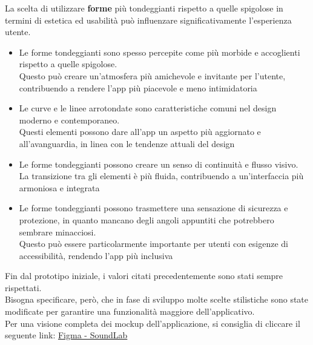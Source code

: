 \documentclass{article}
\begin{document}
		La scelta di utilizzare \textbf{forme} più tondeggianti rispetto a quelle spigolose in termini di estetica ed usabilità può influenzare significativamente l'esperienza utente.
		\begin{itemize}
			\item Le forme tondeggianti sono spesso percepite come più morbide e accoglienti rispetto a quelle spigolose.\\ Questo può creare un'atmosfera più amichevole e invitante per l'utente, contribuendo a rendere l'app più piacevole e meno intimidatoria
			\item Le curve e le linee arrotondate sono caratteristiche comuni nel design moderno e contemporaneo. \\Questi elementi possono dare all'app un aspetto più aggiornato e all'avanguardia, in linea con le tendenze attuali del design
			\item Le forme tondeggianti possono creare un senso di continuità e flusso visivo. La transizione tra gli elementi è più fluida, contribuendo a un'interfaccia più armoniosa e integrata
			\item Le forme tondeggianti possono trasmettere una sensazione di sicurezza e protezione, in quanto mancano degli angoli appuntiti che potrebbero sembrare minacciosi. \\Questo può essere particolarmente importante per utenti con esigenze di accessibilità, rendendo l'app più inclusiva
		\end{itemize}
		Fin dal prototipo iniziale, i valori citati precedentemente sono stati sempre rispettati.\\
		Bisogna specificare, però, che in fase di sviluppo molte scelte stilistiche sono state modificate per garantire una funzionalità maggiore dell'applicativo.\\
		Per una visione completa dei mockup dell'applicazione, si consiglia di cliccare il seguente link: \href{https://www.figma.com/design/Ydobs9LpJIG0QtayPxFLHQ/SoundLab?node-id=0-1&t=WTyvVfdrgmC9HQYu-1}{Figma - SoundLab}
		\hspace{0.1\textwidth}
\end{document}
